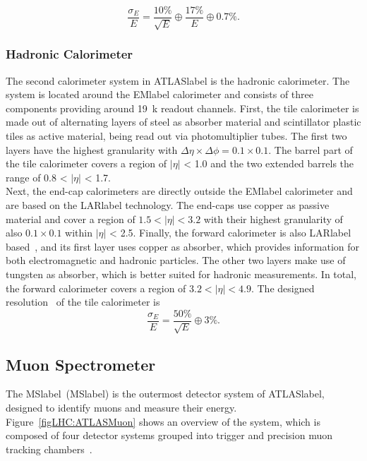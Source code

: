 \begin{equation}
    \frac{\sigma_E}{E} = \frac{10\%}{\sqrt{E}}\oplus\frac{17\%}{E}\oplus 0.7\%.
\end{equation}

\subsubsection*{Hadronic Calorimeter}

The second calorimeter system in \acrshort{ATLASlabel} is the hadronic calorimeter. The system is located around the \acrshort{EMlabel} calorimeter and consists of three components providing around 19~k readout channels. First, the tile calorimeter is made out of alternating layers of steel as absorber material and scintillator plastic tiles as active material, being read out via photomultiplier tubes. The first two layers have the highest granularity with $\Delta\eta\times\Delta\phi= 0.1\times 0.1$. The barrel part of the tile calorimeter covers a region of $|\eta|$ < 1.0 and the two extended barrels the range of 0.8 < $|\eta|$ < 1.7.\\

Next, the end-cap calorimeters are directly outside the \acrshort{EMlabel} calorimeter and are based on the \acrshort{LARlabel} technology. The end-caps use copper as passive material and cover a region of $1.5 < |\eta| < 3.2$ with their highest granularity of also $0.1\times 0.1$ within $|\eta|$ < 2.5. Finally, the forward calorimeter is also \acrshort{LARlabel} based~\cite{Artamonov_2008}, and its first layer uses copper as absorber, which provides information for both electromagnetic and hadronic particles. The other two layers make use of tungsten as absorber, which is better suited for hadronic measurements. In total, the forward calorimeter covers a region of $3.2 < |\eta| < 4.9$.
The designed resolution~\cite{Collaboration_2008} of the tile calorimeter is
\begin{equation}
    \frac{\sigma_E}{E} = \frac{50\%}{\sqrt{E}}\oplus 3\%.
\end{equation}


\subsection{Muon Spectrometer}

The \acrlong{MSlabel}~(\acrshort{MSlabel}) is the outermost detector system of \acrshort{ATLASlabel}, designed to identify muons and measure their energy. Figure~\ref{figLHC:ATLASMuon} shows an overview of the system, which is composed of four detector systems grouped into trigger and precision muon tracking chambers~\cite{CERN-LHCC-97-022,muoncommission}.\\


